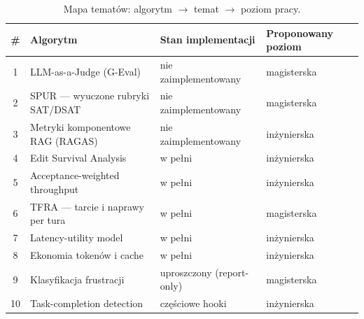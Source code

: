 \documentclass[11pt,a4paper]{article}
\begin{document}
\begin{table}[h!]
\centering
\small
\caption{Mapa tematów: algorytm $\rightarrow$ temat $\rightarrow$ poziom pracy.}
\begin{tabular}{@{}clll@{}}
\toprule
\# & Algorytm & Stan implementacji & Proponowany poziom \\
\midrule
1  & LLM-as-a-Judge (G-Eval)          & nie zaimplementowany   & magisterska \\
2  & SPUR --- wyuczone rubryki SAT/DSAT & nie zaimplementowany  & magisterska \\
3  & Metryki komponentowe RAG (RAGAS) & nie zaimplementowany   & inżynierska \\
4  & Edit Survival Analysis           & w pełni                & inżynierska \\
5  & Acceptance-weighted throughput   & w pełni                & inżynierska \\
6  & TFRA --- tarcie i naprawy per tura & w pełni              & magisterska \\
7  & Latency-utility model            & w pełni                & inżynierska \\
8  & Ekonomia tokenów i cache         & w pełni                & inżynierska \\
9  & Klasyfikacja frustracji          & uproszczony (report-only) & magisterska \\
10 & Task-completion detection        & częściowe hooki        & inżynierska \\
\bottomrule
\end{tabular}
\end{table}
\end{document}
